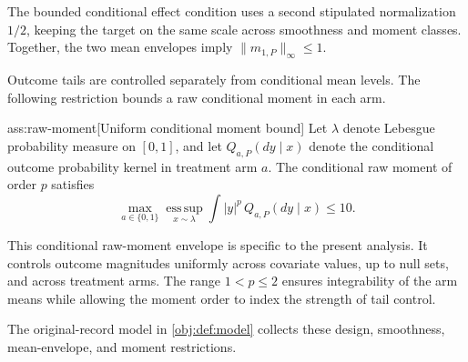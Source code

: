\documentclass[11pt]{article}
\begin{document}
The bounded conditional effect condition uses a second stipulated normalization \(1/2\), keeping the target on the same scale across smoothness and moment classes. Together, the two mean envelopes imply \(\|m_{1,P}\|_\infty\le1\).

Outcome tails are controlled separately from conditional mean levels. The following restriction bounds a raw conditional moment in each arm.

\begin{assumptionv}{ass:raw-moment}[Uniform conditional moment bound]
Let \(\lambda\) denote Lebesgue probability measure on \([0,1]\), and let \(Q_{a,P}(dy\mid x)\) denote the conditional outcome probability kernel in treatment arm \(a\). The conditional raw moment of order \(p\) satisfies
\[
\max_{a\in\{0,1\}}
\operatorname*{ess\,sup}_{x\sim\lambda}
\int |y|^p\,Q_{a,P}(dy\mid x)\le 10.
\]
\end{assumptionv}

This conditional raw-moment envelope is specific to the present analysis. It controls outcome magnitudes uniformly across covariate values, up to null sets, and across treatment arms. The range \(1<p\le2\) ensures integrability of the arm means while allowing the moment order to index the strength of tail control.

The original-record model  in \cref{obj:def:model} collects these design, smoothness, mean-envelope, and moment restrictions.
\end{document}
